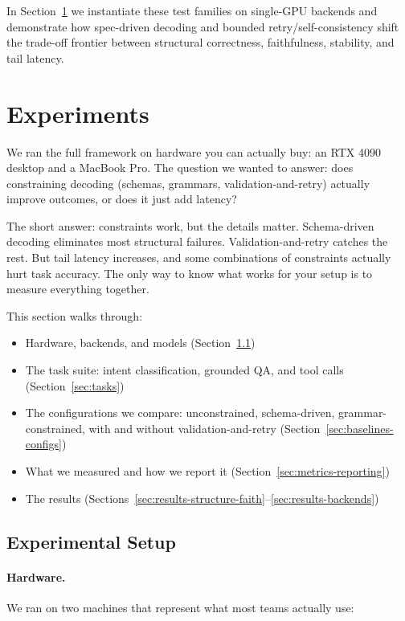 \documentclass[11pt]{article}
\begin{document}
\medskip
In Section~\ref{sec:experiments} we instantiate these test families on single-GPU backends and demonstrate how spec-driven decoding and bounded retry/self-consistency shift the trade-off frontier between structural correctness, faithfulness, stability, and tail latency.

\section{Experiments}
\label{sec:experiments}

We ran the full framework on hardware you can actually buy: an RTX 4090 desktop and a MacBook Pro.
The question we wanted to answer: does constraining decoding (schemas, grammars, validation-and-retry) actually improve outcomes, or does it just add latency?

The short answer: constraints work, but the details matter.
Schema-driven decoding eliminates most structural failures.
Validation-and-retry catches the rest.
But tail latency increases, and some combinations of constraints actually hurt task accuracy.
The only way to know what works for your setup is to measure everything together.

This section walks through:
\begin{itemize}[leftmargin=8pt]
\item Hardware, backends, and models (Section~\ref{sec:setup})
\item The task suite: intent classification, grounded QA, and tool calls (Section~\ref{sec:tasks})
\item The configurations we compare: unconstrained, schema-driven, grammar-constrained, with and without validation-and-retry (Section~\ref{sec:baselines-configs})
\item What we measured and how we report it (Section~\ref{sec:metrics-reporting})
\item The results (Sections~\ref{sec:results-structure-faith}--\ref{sec:results-backends})
\end{itemize}

\subsection{Experimental Setup}
\label{sec:setup}

\paragraph{Hardware.}
We ran on two machines that represent what most teams actually use:
\end{document}
